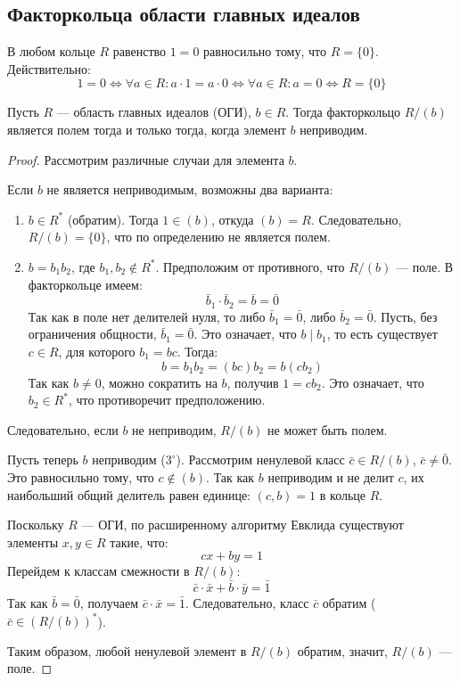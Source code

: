 \subsection{Факторкольца области главных идеалов}

\begin{Remark}{}{}
	В любом кольце $R$ равенство $1 = 0$ равносильно тому, что $R = \{0\}$.
	Действительно:
	\[ 1 = 0 \iff \forall a \in R \colon a \cdot 1 = a \cdot 0 \iff \forall a \in R \colon a = 0 \iff R = \{0\} \]
\end{Remark}

\begin{Proposition}{}{}
	Пусть $R$ --- область главных идеалов (ОГИ), $b \in R$. Тогда факторкольцо $R/(b)$ является полем тогда и только тогда, когда элемент $b$ неприводим.
\end{Proposition}

\begin{proof}
	Рассмотрим различные случаи для элемента $b$.
	
	Если $b$ не является неприводимым, возможны два варианта:
	\begin{enumerate}
		\item[$1^\circ$)] $b \in R^*$ (обратим). Тогда $1 \in (b)$, откуда $(b) = R$. Следовательно, $R/(b) = \{0\}$, что по определению не является полем.
		\item[$2^\circ$)] $b = b_1 b_2$, где $b_1, b_2 \notin R^*$. Предположим от противного, что $R/(b)$ --- поле. В факторкольце имеем:
		\[ \bar{b}_1 \cdot \bar{b}_2 = \bar{b} = \bar{0} \]
		Так как в поле нет делителей нуля, то либо $\bar{b}_1 = \bar{0}$, либо $\bar{b}_2 = \bar{0}$. Пусть, без ограничения общности, $\bar{b}_1 = \bar{0}$. Это означает, что $b \mid b_1$, то есть существует $c \in R$, для которого $b_1 = bc$. Тогда:
		\[ b = b_1 b_2 = (bc) b_2 = b (cb_2) \]
		Так как $b \neq 0$, можно сократить на $b$, получив $1 = cb_2$. Это означает, что $b_2 \in R^*$, что противоречит предположению.
	\end{enumerate}
	Следовательно, если $b$ не неприводим, $R/(b)$ не может быть полем.
	
	Пусть теперь $b$ неприводим ($3^\circ$). 
	Рассмотрим ненулевой класс $\bar{c} \in R/(b)$, $\bar{c} \neq \bar{0}$. Это равносильно тому, что $c \notin (b)$. Так как $b$ неприводим и не делит $c$, их наибольший общий делитель равен единице: $(c, b) = 1$ в кольце $R$.
	
	Поскольку $R$ --- ОГИ, по расширенному алгоритму Евклида существуют элементы $x, y \in R$ такие, что:
	\[ cx + by = 1 \]
	Перейдем к классам смежности в $R/(b)$:
	\[ \bar{c} \cdot \bar{x} + \bar{b} \cdot \bar{y} = \bar{1} \]
	Так как $\bar{b} = \bar{0}$, получаем $\bar{c} \cdot \bar{x} = \bar{1}$. Следовательно, класс $\bar{c}$ обратим ($\bar{c} \in (R/(b))^*$).
	
	Таким образом, любой ненулевой элемент в $R/(b)$ обратим, значит, $R/(b)$ --- поле.
\end{proof}

